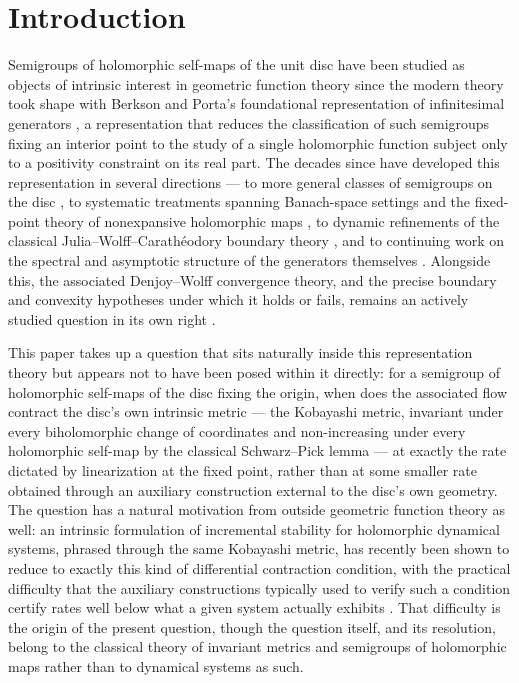 \documentclass[pdflatex,sn-mathphys-num]{sn-jnl}%
\theoremstyle{thmstyleone}%
\theoremstyle{thmstyletwo}%
\theoremstyle{thmstylethree}%
\begin{document}
\section{Introduction}
\label{sec:intro}

Semigroups of holomorphic self-maps of the unit disc have been studied as objects of intrinsic interest in geometric function theory since the modern theory took shape with Berkson and Porta's foundational representation of infinitesimal generators \cite{berkson1978semigroups}, a representation that reduces the classification of such semigroups fixing an interior point to the study of a single holomorphic function subject only to a positivity constraint on its real part. The decades since have developed this representation in several directions --- to more general classes of semigroups on the disc \cite{bracci2007infinitesimal}, to systematic treatments spanning Banach-space settings and the fixed-point theory of nonexpansive holomorphic maps \cite{reichshoikhet2005nonlinear}, to dynamic refinements of the classical Julia--Wolff--Carath\'eodory boundary theory \cite{elinshoikhet2001dynamic}, and to continuing work on the spectral and asymptotic structure of the generators themselves \cite{kourou2025eigenvalues}. Alongside this, the associated Denjoy--Wolff convergence theory, and the precise boundary and convexity hypotheses under which it holds or fails, remains an actively studied question in its own right \cite{bracci2025failure,christodoulou2021stability}.

This paper takes up a question that sits naturally inside this representation theory but appears not to have been posed within it directly: for a semigroup of holomorphic self-maps of the disc fixing the origin, when does the associated flow contract the disc's own intrinsic metric --- the Kobayashi metric, invariant under every biholomorphic change of coordinates and non-increasing under every holomorphic self-map by the classical Schwarz--Pick lemma \cite{ahlfors1979complex,kobayashi1967invariant} --- at exactly the rate dictated by linearization at the fixed point, rather than at some smaller rate obtained through an auxiliary construction external to the disc's own geometry. The question has a natural motivation from outside geometric function theory as well: an intrinsic formulation of incremental stability for holomorphic dynamical systems, phrased through the same Kobayashi metric, has recently been shown to reduce to exactly this kind of differential contraction condition, with the practical difficulty that the auxiliary constructions typically used to verify such a condition certify rates well below what a given system actually exhibits \cite{lohmiller1998contraction}. That difficulty is the origin of the present question, though the question itself, and its resolution, belong to the classical theory of invariant metrics and semigroups of holomorphic maps rather than to dynamical systems as such.
\end{document}
